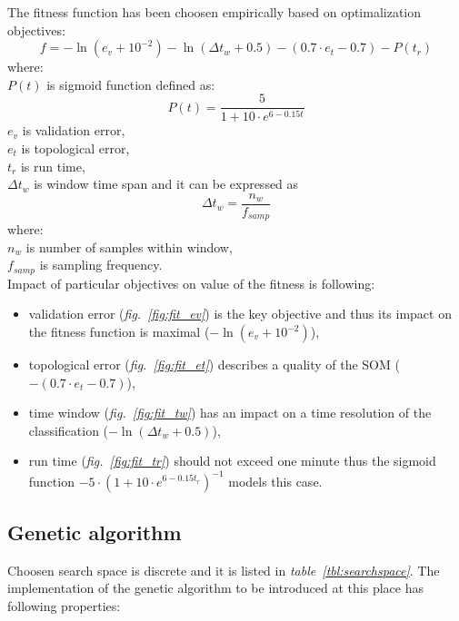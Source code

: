 \documentclass[a4paper]{IEEEtran}
\begin{document}
The fitness function has been choosen empirically based on optimalization objectives:
\[ f = -\ln(e_v+10^{-2 }) - \ln(\Delta t_w+0.5) - (0.7\cdot e_t-0.7) - P(t_r) \]
where:\\
$ P(t) $ is sigmoid function defined as:
\[ P(t) = \frac{5}{1+10\cdot e^{6-0.15t}} \]
$ e_v $ is validation error,\\
$ e_t $ is topological error,\\
$ t_r $ is run time,\\
$ \Delta t_w $ is window time span and it can be expressed as 
\[  \Delta t_w = \frac{n_w}{f_{samp}}  \]
where:\\
$ n_w $ is number of samples within window,\\
$ f_{samp} $ is sampling frequency.
\\

Impact of particular objectives on value of the fitness is following:
\begin{itemize}
	\item validation error (\textit{fig.~\ref{fig:fit_ev}}) is the key objective and thus its impact
	on the fitness function is maximal ($ -\ln(e_v+10^{-2 }) $),
	\item topological error (\textit{fig.~\ref{fig:fit_et}}) describes a quality 
	of the SOM ($ -(0.7\cdot e_t-0.7) $),
	\item time window (\textit{fig.~\ref{fig:fit_tw}}) has an impact on a time resolution
	of the classification ($ -\ln(\Delta t_w+0.5) $),
	\item run time  (\textit{fig.~\ref{fig:fit_tr}}) should not exceed one minute thus 
	the sigmoid function $ - 5 \cdot (1+10\cdot e^{6-0.15t_r})^{-1} $ 
	models this case.
\end{itemize}

\subsection{Genetic algorithm}
\label{sec:ex_ga}
Choosen search space is discrete and it is listed  in \textit{table~\ref{tbl:searchspace}}.
The implementation of the genetic algorithm to be introduced at this place
has following properties:
\end{document}
